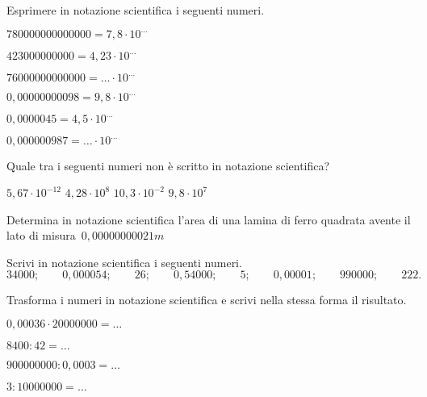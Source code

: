 \subsubsection*{}

\begin{esercizio}
 \label{ese:3.61}
Esprimere in notazione scientifica i seguenti numeri.
\begin{multicols}{2}
\begin{enumeratea}
\item \(780000000000000=7,8\cdot10^{\ldots}\)
\item \(423000000000=4,23\cdot10^{\ldots}\)
\item \(76000000000000= \ldots \cdot 10^{\ldots}\)
\item \(0,00000000098=9,8\cdot10^{\ldots}\)
\item \(0,0000045=4,5\cdot10^{\ldots}\)
\item \(0,000000987= \ldots \cdot 10^{\ldots}\)
\end{enumeratea}
\end{multicols}
\end{esercizio}

\begin{esercizio}
 \label{ese:3.62}
Quale tra i seguenti numeri non è scritto in notazione scientifica?

\boxA\quad\(5,67\cdot 10^{-12}\)\qquad
\boxB\quad\(4,28\cdot 10^8\)\qquad
\boxC\quad\(10,3\cdot 10^{-2}\)\qquad
\boxD\quad\(9,8\cdot 10^7\)\qquad
\end{esercizio}

\begin{esercizio}
 \label{ese:3.63}
Determina in notazione scientifica l'area di una lamina di ferro quadrata
avente il lato di misura~\(0,00000000021\unit{m}\)
\end{esercizio}

\begin{esercizio}
 \label{ese:3.64}
Scrivi in notazione scientifica i seguenti numeri.
\[34000;\qquad0,000054;\qquad26;\qquad0,54000;\qquad5;\qquad0,00001;
\qquad990000;\qquad222.\]
\end{esercizio}

\begin{esercizio}
 \label{ese:3.65}
Trasforma i numeri in notazione scientifica e scrivi nella stessa forma il 
risultato.
\begin{multicols}{2}
\begin{enumeratea}
\item \(0,00036\cdot20000000=\ldots\)
\item \(8400:42=\ldots\)
\item \(900000000:0,0003=\ldots\)
\item \(3:10000000=\ldots\)
\end{enumeratea}
\end{multicols}
\end{esercizio}

